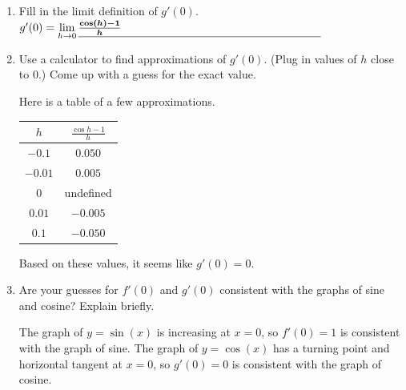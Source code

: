 \documentclass{article}
\begin{document}
\begin{enumerate}
\begin{enumerate}
\begin{solution}
\begin{tabular}{c|c}
$h$     & $\frac{\sin h}{h}$ \\ \hline
$-0.1$  & $0.998$           \\
$-0.01$ & $0.999$           \\
$0$     & undefined          \\
$0.01$  & $0.999$           \\
$0.1$   & $0.998$          
\end{tabular}

Based on these values, it seems like $f'(0)=1$.
    \end{solution}

        \item 
    \begin{problem}
    Fill in the limit definition of $g'(0)$. $g'(0) = \displaystyle
      \lim_{h \to 0} \fitb[\vphantom{\dfrac{0}{0}}]{3in}{\frac{\cos(h)-1}{h}}$
      \end{problem}

    \item 
    \begin{problem}
    Use a calculator to find approximations of $g'(0)$. (Plug in values of $h$ close to $0$.) Come up with a guess for the exact value.
      \end{problem}
      \pspace{\vfill}

    \begin{solution}
        Here is a table of a few approximations.

        \begin{tabular}{c|c}
$h$     & $\frac{\cos h-1}{h}$ \\ \hline
$-0.1$  & $0.050$             \\
$-0.01$ & $0.005$             \\
$0$     & undefined            \\
$0.01$  & $-0.005$            \\
$0.1$   & $-0.050$           
\end{tabular}

Based on these values, it seems like $g'(0)=0$.
    \end{solution}

    \item 
    \begin{problem}
        Are your guesses for $f'(0)$ and $g'(0)$ consistent with the graphs of sine and cosine? Explain briefly.
    \end{problem}
    \pspace{\vfill}

    \begin{solution}
        The graph of $y=\sin(x)$ is increasing at $x=0$, so $f'(0)=1$ is consistent with the graph of sine. The graph of $y=\cos(x)$ has a turning point and horizontal tangent at $x=0$, so $g'(0)=0$ is consistent with the graph of cosine.
    \end{solution}
\end{enumerate}

\end{enumerate}



\end{document}
